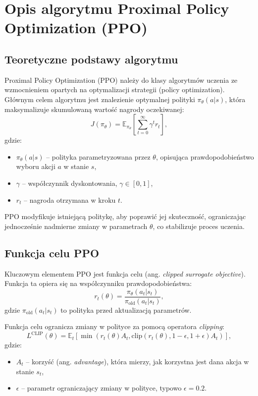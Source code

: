 \documentclass[conference]{IEEEtran}
\begin{document}
\section{Opis algorytmu Proximal Policy Optimization (PPO)}

\subsection{Teoretyczne podstawy algorytmu}
Proximal Policy Optimization (PPO) należy do klasy algorytmów uczenia ze wzmocnieniem opartych na optymalizacji strategii (policy optimization). Głównym celem algorytmu jest znalezienie optymalnej polityki \(\pi_\theta(a|s)\), która maksymalizuje skumulowaną wartość nagrody oczekiwanej:
\begin{equation}
J(\pi_\theta) = \mathbb{E}_{\pi_\theta} \left[ \sum_{t=0}^\infty \gamma^t r_t \right],
\end{equation}
gdzie:
\begin{itemize}
    \item \(\pi_\theta(a|s)\) – polityka parametryzowana przez \(\theta\), opisująca prawdopodobieństwo wyboru akcji \(a\) w stanie \(s\),
    \item \(\gamma\) – współczynnik dyskontowania, \(\gamma \in [0, 1]\),
    \item \(r_t\) – nagroda otrzymana w kroku \(t\).
\end{itemize}

PPO modyfikuje istniejącą politykę, aby poprawić jej skuteczność, ograniczając jednocześnie nadmierne zmiany w parametrach \(\theta\), co stabilizuje proces uczenia.

\subsection{Funkcja celu PPO}
Kluczowym elementem PPO jest funkcja celu (ang. \textit{clipped surrogate objective}). Funkcja ta opiera się na współczynniku prawdopodobieństwa:
\begin{equation}
r_t(\theta) = \frac{\pi_\theta(a_t | s_t)}{\pi_\text{old}(a_t | s_t)},
\end{equation}
gdzie \(\pi_\text{old}(a_t | s_t)\) to polityka przed aktualizacją parametrów.

Funkcja celu ogranicza zmiany w polityce za pomocą operatora \textit{clipping}:
\begin{equation}
L^\text{CLIP}(\theta) = \mathbb{E}_t \left[ \min \left( r_t(\theta) A_t, \text{clip}(r_t(\theta), 1 - \epsilon, 1 + \epsilon) A_t \right) \right],
\end{equation}
gdzie:
\begin{itemize}
    \item \(A_t\) – korzyść (ang. \textit{advantage}), która mierzy, jak korzystna jest dana akcja w stanie \(s_t\),
    \item \(\epsilon\) – parametr ograniczający zmiany w polityce, typowo \(\epsilon = 0.2\).
\end{itemize}
\end{document}
